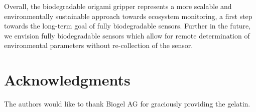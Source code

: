 Overall, the biodegradable origami gripper represents a more scalable and environmentally sustainable approach towards ecosystem monitoring, a first step towards the long-term goal of fully biodegradable sensors. Further in the future, we envision fully biodegradable sensors which allow for remote determination of environmental parameters without re-collection of the sensor.










\section*{Acknowledgments}
The authors would like to thank Biogel AG for graciously providing the gelatin.




